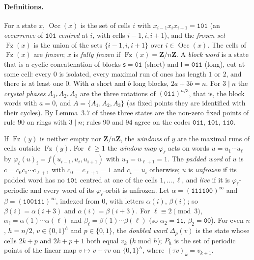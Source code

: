 \documentclass[10pt,a4paper]{article}
\newcommand{\Zn}{\mathbf{Z}/n\mathbf{Z}}      %
\newcommand{\code}[1]{\mathtt{#1}}            %
\newcommand{\Occ}{\operatorname{Occ}}         %
\newcommand{\Fz}{\operatorname{Fz}}           %
\begin{document}
\paragraph{Definitions.}
For a state $x$, $\Occ(x)$ is the set of cells $i$ with $x_{i-1}x_ix_{i+1}=\code{101}$ (an \emph{occurrence}
of $\code{101}$ \emph{centred} at $i$, with cells $i-1,i,i+1$), and the \emph{frozen set} $\Fz(x)$ is the union of
the sets $\{i-1,i,i+1\}$ over $i\in\Occ(x)$. The cells of $\Fz(x)$ are \emph{frozen}; $x$ is \emph{fully frozen} if
$\Fz(x)=\Zn$.
A \emph{block word} is a state that is a cyclic concatenation of blocks $\mathsf{s}=\code{01}$ (short) and
$\mathsf{l}=\code{011}$ (long), cut at some cell: every $0$ is isolated, every maximal run of ones has length $1$
or $2$, and there is at least one $0$. With $a$ short and $b$ long blocks, $2a+3b=n$.
For $3\mid n$ the \emph{crystal phases} $A_1,A_2,A_3$ are the three rotations of $(\code{011})^{n/3}$, that is, the
block words with $a=0$, and $A=\{A_1,A_2,A_3\}$ (as fixed points they are identified with their cycles).
By Lemma~3.7 of \cite{MartinOdlyzkoWolfram1984} these three states are the non-zero fixed points of rule 90 on
rings with $3\mid n$; rules 90 and 94 agree on the codes $\code{011}$, $\code{101}$, $\code{110}$.

If $\Fz(y)$ is neither empty nor $\Zn$, the \emph{windows} of $y$ are the maximal runs of cells outside $\Fz(y)$.
For $\ell\ge1$ the \emph{window map} $\varphi_\ell$ acts on words $u=u_1\cdots u_\ell$ by
$\varphi_\ell(u)_i=f(u_{i-1},u_i,u_{i+1})$ with $u_0=u_{\ell+1}=1$. The \emph{padded word} of $u$ is
$c=c_0c_1\cdots c_{\ell+1}$ with $c_0=c_{\ell+1}=1$ and $c_i=u_i$ otherwise; $u$ is \emph{unfrozen} if its padded
word has no $\code{101}$ centred at one of the cells $1,\dots,\ell$, and \emph{live} if it is
$\varphi_\ell$-periodic and every word of its $\varphi_\ell$-orbit is unfrozen.
Let $\alpha=(\code{111100})^{\infty}$ and $\beta=(\code{100111})^{\infty}$, indexed from $0$, with letters
$\alpha(i)$, $\beta(i)$; so $\beta(i)=\alpha(i+3)$ and $\alpha(i)=\beta(i+3)$. For $\ell\equiv2\pmod 3$,
$\alpha_\ell=\alpha(1)\cdots\alpha(\ell)$ and $\beta_\ell=\beta(1)\cdots\beta(\ell)$ (so $\alpha_2=\code{11}$, $\beta_2=\code{00}$).
For even $n$, $h=n/2$, $v\in\{0,1\}^h$ and $p\in\{0,1\}$, the \emph{doubled word} $\Delta_p(v)$ is the state whose
cells $2k+p$ and $2k+p+1$ both equal $v_k$ ($k$ mod $h$); $P_h$ is the set of periodic points of the linear map
$v\mapsto v+\tau v$ on $\{0,1\}^h$, where $(\tau v)_k=v_{k+1}$.
\end{document}
